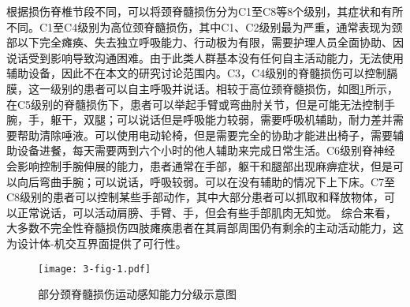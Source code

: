 根据损伤脊椎节段不同，可以将颈脊髓损伤分为C1至C8等8个级别，其症状和有所不同。C1至C4级别为高位颈脊髓损伤，其中C1、C2级别最为严重，通常表现为颈部以下完全瘫痪、失去独立呼吸能力、行动极为有限，需要护理人员全面协助、因说话受到影响导致沟通困难。由于此类人群基本没有任何自主活动能力，无法使用辅助设备，因此不在本文的研究讨论范围内。C3，C4级别的脊髓损伤可以控制膈膜，这一级别的患者可以自主呼吸并说话。相较于高位颈脊髓损伤，如图\ref{3-fig-1}所示，在C5级别的脊髓损伤下，患者可以举起手臂或弯曲肘关节，但是可能无法控制手腕，手，躯干，双腿；可以说话但是呼吸能力较弱，需要呼吸机辅助，耐力差并需要帮助清除唾液。可以使用电动轮椅，但是需要完全的协助才能进出椅子，需要辅助设备进餐，每天需要两到六个小时的他人辅助来完成日常生活。C6级别脊神经会影响控制手腕伸展的能力，患者通常在手部，躯干和腿部出现麻痹症状，但是可以向后弯曲手腕；可以说话，呼吸较弱。可以在没有辅助的情况下上下床。C7至C8级别的患者可以控制某些手部动作，其中大部分患者可以抓取和释放物体，可以正常说话，可以活动肩膀、手臂、手，但会有些手部肌肉无知觉。
综合来看，大多数不完全性脊髓损伤四肢瘫痪患者在其肩部周围仍有剩余的主动活动能力\cite{shefflerNeuromuscularElectricalStimulation2007}，这为设计体-机交互界面提供了可行性。

\begin{figure}[!t]
    \centering
    \texttt{[image: 3-fig-1.pdf]}
    \caption{部分颈脊髓损伤运动感知能力分级示意图}
    \label{3-fig-1}
\end{figure}     


